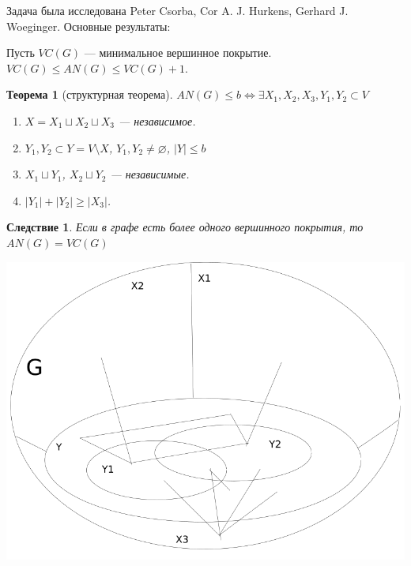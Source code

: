\documentclass{beamer}
\newtheorem{thm}{Теорема}
\newtheorem{cl}{Следствие}
\theoremstyle{definition}
\begin{document}
\begin{frame}
Задача была исследована Peter Csorba, Cor A. J. Hurkens, Gerhard J. Woeginger.
Основные результаты:
\begin{lemma}
Пусть $VC(G)$ --- минимальное вершинное покрытие. 
$VC(G) \le AN(G) \le VC(G) + 1$.
\end{lemma}
\end{frame}

\begin{frame}
\begin{thm}[структурная теорема]
$AN(G) \le b \Leftrightarrow \exists X_1, X_2, X_3, Y_1, Y_2 \subset V$
\begin{enumerate}
\item $X = X_1 \sqcup X_2 \sqcup X_3$ --- независимое.
\item $Y_1, Y_2 \subset Y = V \setminus X$, $Y_1, Y_2 \neq \varnothing$, $|Y| \le b$
\item $X_1 \sqcup Y_1$, $X_2 \sqcup Y_2$ --- независимые.
\item $|Y_1| + |Y_2| \ge |X_3|$.
\end{enumerate}
\end{thm}
\begin{cl}
Если в графе есть более одного вершинного покрытия, то $AN(G) = VC(G)$
\end{cl}
\end{frame}
\begin{frame}
\includegraphics[scale=0.4]{structure.png}
\end{frame}
\end{document}
